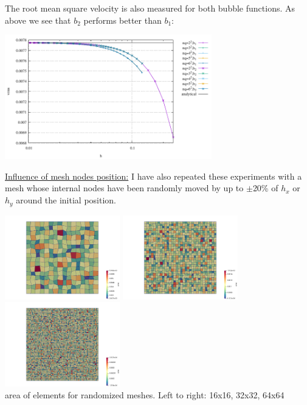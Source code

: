 The root mean square velocity is also measured for both bubble functions.
As above we see that $b_2$ performs better than $b_1$:
\begin{center}
\includegraphics[width=9cm]{python_codes/fieldstone_72/results/mms/vrms}
\end{center}

\vspace{.5cm}

\underline{Influence of mesh nodes position:} I have also repeated these 
experiments with a mesh whose internal nodes have been 
randomly moved by up to $\pm$20\% of $h_x$ or $h_y$ around the initial position. 

\begin{center}
\includegraphics[width=5cm]{python_codes/fieldstone_72/results/mms/area16}
\includegraphics[width=5cm]{python_codes/fieldstone_72/results/mms/area32}
\includegraphics[width=5cm]{python_codes/fieldstone_72/results/mms/area64}\\
{\captionfont area of elements for randomized meshes. Left to right: 16x16, 32x32, 64x64}
\end{center}


